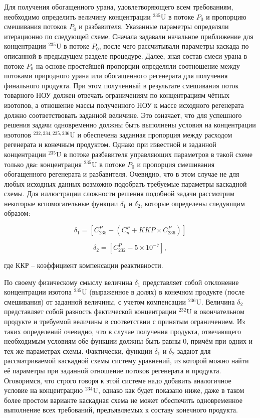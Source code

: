 Для получения обогащенного урана, удовлетворяющего всем требованиям, необходимо определить величину концентрации $^{235}$U в потоке $P_0$ и пропорцию смешивания потоков $P_0$ и разбавителя. Указанные параметры определяли итерационно по следующей схеме. Сначала задавали начальное приближение для концентрации $^{235}$U в потоке $P_0$, после чего рассчитывали параметры каскада по описанной в предыдущем разделе процедуре. Далее, зная состав смеси урана в потоке $P_0$ на основе простейшей пропорции определяли соотношение между потоками природного урана или обогащенного регенерата для получения финального продукта. При этом полученный в результате смешивания поток товарного НОУ должен отвечать ограничениям по концентрациям чётных изотопов, а отношение массы полученного НОУ к массе исходного регенерата должно соответствовать заданной величине. Это означает, что для успешного решения задачи одновременно должны быть выполнены условия на концентрации изотопов $^{232,234,235,236}$U и обеспечена заданная пропорция между расходом регенерата и конечным продуктом. Однако при известной и заданной концентрации $^{235}$U в потоке разбавителя управляющих параметров в такой схеме только два: концентрация $^{235}$U в потоке $P_0$ и пропорция смешивания обогащенного регенерата и разбавителя. Очевидно, что в этом случае не для любых исходных данных возможно подобрать требуемые параметры каскадной схемы. 
Для иллюстрации сложности решения подобной задачи рассмотрим некоторые вспомогательные функции $\delta_1$ и $\delta_2$, которые определены следующим образом:

\begin{equation} \label{d1} 
  \delta_1=\left[C_{235}^P-\left(C_n^P+KKP\times C_{236}^P\right)\right]
\end{equation} 

\begin{equation} \label{d2} 
    \delta_2=\left[C_{232}^P-5\times10^{-7}\right],             
\end{equation}

где ККР -- коэффициент компенсации реактивности.

По своему физическому смыслу величина $\delta_1$ представляет собой отклонение концентрации изотопа $^{235}$U (выраженное в долях) в конечном продукте (после смешивания) от заданной величины, с учетом компенсации $^{236}$U. Величина $\delta_2$ представляет собой разность фактической концентрации $^{232}$U в окончательном продукте и требуемой величины в соответствии с принятым ограничением. Из таких определений очевидно, что в случае получения продукта, отвечающего необходимым условиям обе функции должны быть равны 0, причём при одних и тех же параметрах схемы. Фактически, функции $\delta_1$ и $\delta_2$ задают для рассматриваемой каскадной схемы систему уравнений, из которой можно найти её параметры при заданной отношение потоков регенерата и продукта. Оговоримся, что строго говоря к этой системе надо добавить аналогичное условие на концентрацию $^{234}$U, однако как будет показано ниже, даже в таком более простом варианте каскадная схема не может обеспечить одновременное выполнение всех требований, предъявляемых к составу конечного продукта.   

